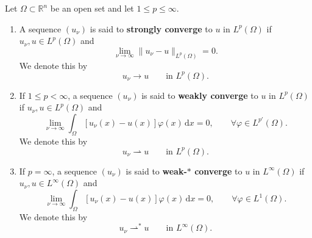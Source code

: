 \begin{definition}
    \label{def:Lp-convergence}

    Let $\Omega\subset\mathbb{R}^n$ be an open set and let
    $1\leq p\leq\infty$.

    \begin{enumerate}
        \item[(i)] A sequence $(u_\nu)$ is said to \textbf{strongly converge}
        to $u$ in $L^p(\Omega)$ if $u_\nu,u\in L^p(\Omega)$ and
        \[
            \lim_{\nu\rightarrow\infty}
            \|u_\nu-u\|_{L^p(\Omega)}
            =0.
        \]
        We denote this by
        \[
            u_\nu\rightarrow u
            \qquad\text{in }L^p(\Omega).
        \]

        \item[(ii)] If $1\leq p<\infty$, a sequence $(u_\nu)$ is said to
        \textbf{weakly converge} to $u$ in $L^p(\Omega)$ if
        $u_\nu,u\in L^p(\Omega)$ and
        \[
            \lim_{\nu\rightarrow\infty}
            \int_\Omega
            [u_\nu(x)-u(x)]\varphi(x)\,\mathrm{d}x
            =0,
            \qquad
            \forall\varphi\in L^{p'}(\Omega).
        \]
        We denote this by
        \[
            u_\nu\rightharpoonup u
            \qquad\text{in }L^p(\Omega).
        \]

        \item[(iii)] If $p=\infty$, a sequence $(u_\nu)$ is said to
        \textbf{weak-$*$ converge} to $u$ in $L^\infty(\Omega)$ if
        $u_\nu,u\in L^\infty(\Omega)$ and
        \[
            \lim_{\nu\rightarrow\infty}
            \int_\Omega
            [u_\nu(x)-u(x)]\varphi(x)\,\mathrm{d}x
            =0,
            \qquad
            \forall\varphi\in L^1(\Omega).
        \]
        We denote this by
        \[
            u_\nu\rightharpoonup^* u
            \qquad\text{in }L^\infty(\Omega).
        \]
    \end{enumerate}
\end{definition}


